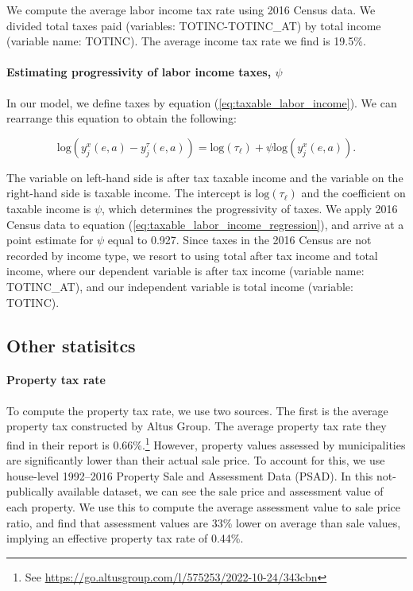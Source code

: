 \documentclass[parskip=full]{article}
\begin{document}
We compute the average labor income tax rate using 2016 Census data. We divided total taxes paid (variables: TOTINC-TOTINC\_AT) by total income (variable name: TOTINC). The average income tax rate we find is 19.5\%.

\paragraph{Estimating progressivity of labor income taxes, $\psi$}

In our model, we define taxes by equation (\ref{eq:taxable_labor_income}). We can rearrange this equation to obtain the following:

\begin{equation}\label{eq:taxable_labor_income_regression}
  \mbox{log}(y^{x}_{j}(e,a)-y^{\tau}_{j}(e,a))=\mbox{log}(\tau_{\ell})+\psi \mbox{log}(y^{x}_{j}(e,a)).
\end{equation}

\noindent The variable on left-hand side is after tax taxable income and the variable on the right-hand side is taxable income. The intercept is $\mbox{log}(\tau_{\ell})$ and the coefficient on taxable income is $\psi$, which determines the progressivity of taxes. We apply 2016 Census data to equation (\ref{eq:taxable_labor_income_regression}), and arrive at a point estimate for $\psi$ equal to 0.927. Since taxes in the 2016 Census are not recorded by income type, we resort to using total after tax income and total income, where our dependent variable is after tax income (variable name: TOTINC\_AT), and our independent variable is total income (variable: TOTINC).

\subsection{Other statisitcs}

\paragraph{Property tax rate}

To compute the property tax rate, we use two sources. The first is the average property tax constructed by Altus Group. The average property tax rate they find in their report is 0.66\%.\footnote{See \url{https://go.altusgroup.com/l/575253/2022-10-24/343cbn}} However, property values assessed by municipalities are significantly lower than their actual sale price. To account for this, we use house-level 1992--2016 Property Sale and Assessment Data (PSAD). In this not-publically available dataset, we can see the sale price and assessment value of each property. We use this to compute the average assessment value to sale price ratio, and find that assessment values are 33\% lower on average than sale values, implying an effective property tax rate of 0.44\%.
\end{document}
